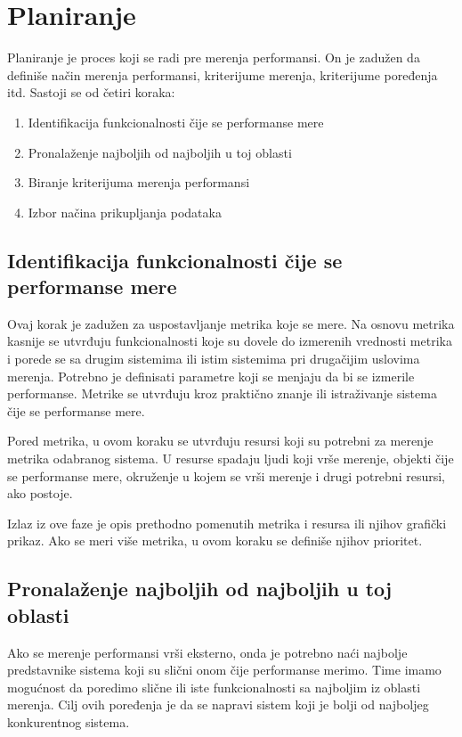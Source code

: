 \documentclass[12pt]{report}
\begin{document}
\section{Planiranje}
Planiranje je proces koji se radi pre merenja performansi. On je zadužen da definiše način merenja performansi, kriterijume merenja, kriterijume poređenja itd. Sastoji se od četiri koraka:
\begin{samepage}
    \begin{enumerate}
        \item Identifikacija funkcionalnosti čije se performanse mere
        \item Pronalaženje najboljih od najboljih u toj oblasti
        \item Biranje kriterijuma merenja performansi
        \item Izbor načina prikupljanja podataka
    \end{enumerate}
\end{samepage}

\subsection{Identifikacija funkcionalnosti čije se performanse mere}
Ovaj korak je zadužen za uspostavljanje metrika koje se mere. Na osnovu metrika kasnije se  utvrđuju funkcionalnosti koje su dovele do izmerenih vrednosti metrika i porede se sa drugim sistemima ili istim sistemima pri drugačijim uslovima merenja. Potrebno je definisati parametre koji se menjaju da bi se izmerile performanse. Metrike se utvrđuju kroz praktično znanje ili istraživanje sistema čije se performanse mere.

Pored metrika, u ovom koraku se utvrđuju resursi koji su potrebni za merenje metrika odabranog sistema. U resurse spadaju ljudi koji vrše merenje, objekti čije se performanse mere, okruženje u kojem se vrši merenje i drugi potrebni resursi, ako postoje.

Izlaz iz ove faze je opis prethodno pomenutih metrika i resursa ili njihov grafički prikaz. Ako se meri više metrika, u ovom koraku se definiše njihov prioritet.

\subsection{Pronalaženje najboljih od najboljih u toj oblasti}
Ako se merenje performansi vrši eksterno, onda je potrebno naći najbolje predstavnike sistema koji su slični onom čije performanse merimo. Time imamo mogućnost da poredimo slične ili iste funkcionalnosti sa najboljim iz oblasti merenja. Cilj ovih poređenja je da se napravi sistem koji je bolji od najboljeg konkurentnog sistema.
\end{document}
